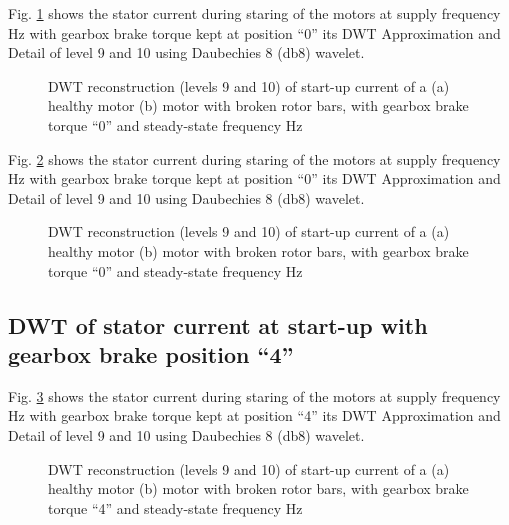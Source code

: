 \documentclass[a4paper,11pt]{report}
\begin{document}
\clearpage

Fig. \ref{hb040st} shows the stator current during staring of the motors at supply frequency \unit[40]{Hz} with gearbox brake torque kept at position ``0'' its DWT Approximation and Detail of level 9 and 10 using Daubechies 8 (db8) wavelet.

\begin{figure}[h]
\centering
\subfigure[]{\texttt{[image: h040st]}}
\subfigure[]{\texttt{[image: b040st]}}
\caption{DWT reconstruction (levels 9 and 10) of start-up current of a (a) healthy motor (b) motor with broken rotor bars, with gearbox brake torque ``0'' and steady-state frequency \unit[40]{Hz}} \label{hb040st}
\end{figure}

\clearpage

Fig. \ref{hb050st} shows the stator current during staring of the motors at supply frequency \unit[50]{Hz} with gearbox brake torque kept at position ``0'' its DWT Approximation and Detail of level 9 and 10 using Daubechies 8 (db8) wavelet.

\begin{figure}[h]
\centering
\subfigure[]{\texttt{[image: h050st]}}
\subfigure[]{\texttt{[image: b050st]}}
\caption{DWT reconstruction (levels 9 and 10) of start-up current of a (a) healthy motor (b) motor with broken rotor bars, with gearbox brake torque ``0'' and steady-state frequency \unit[50]{Hz}} \label{hb050st}
\end{figure}

\clearpage
\subsection{DWT of stator current at start-up with gearbox brake position ``4''}

Fig. \ref{hb430st} shows the stator current during staring of the motors at supply frequency \unit[30]{Hz} with gearbox brake torque kept at position ``4'' its DWT Approximation and Detail of level 9 and 10 using Daubechies 8 (db8) wavelet.

\begin{figure}[h]
\centering
\subfigure[]{\texttt{[image: h430st]}}
\subfigure[]{\texttt{[image: b430st]}}
\caption{DWT reconstruction (levels 9 and 10) of start-up current of a (a) healthy motor (b) motor with broken rotor bars, with gearbox brake torque ``4'' and steady-state frequency \unit[30]{Hz}} \label{hb430st}
\end{figure}
\end{document}
